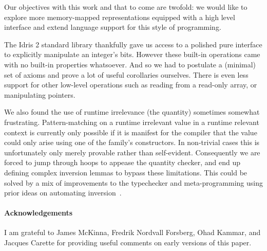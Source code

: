 \documentclass{article}
\newcommand{\idris}{Idris 2}
\begin{document}
Our objectives with this work and that to come are twofold: we would like to
explore more memory-mapped representations equipped with a high level interface
and extend language support for this style of programming.

The \idris{} standard library thankfully gave us access to a polished pure interface
to explicitly manipulate an integer's bits.
%
However these built-in operations came with no built-in properties whatsoever.
%
And so we had to postulate a (minimal) set of axioms and prove a lot of useful
corollaries ourselves.
%
There is even less support for other low-level operations such as reading from
a read-only array, or manipulating pointers.

We also found the use of runtime irrelevance (the  quantity)
sometimes somewhat frustrating.
%
Pattern-matching on a runtime irrelevant value in a runtime relevant context
is currently only possible if it is manifest for the compiler that the value
could only arise using one of the family's constructors.
%
In non-trivial cases this is unfortunately only merely provable rather than
self-evident.
%
Consequently we are forced to jump through hoops to appease the quantity
checker, and end up defining complex inversion lemmas to bypass these
limitations.
%
This could be solved by a mix of improvements to the typechecker and
meta-programming using prior ideas on automating
inversion~\cite{DBLP:conf/types/CornesT95,DBLP:conf/types/McBride96,monin:inria-00489412}.


\paragraph{Acknowledgements}
I am grateful to
James McKinna,
Fredrik Nordvall Forsberg,
Ohad Kammar,
and Jacques Carette
for providing useful comments on early
versions of this paper.


\end{document}
